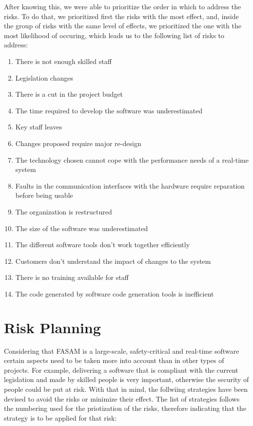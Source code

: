 After knowing this, we were able to prioritize the order in which to address the risks. To do that, we prioritized first the risks with the most effect, and, inside the group of risks with the same level of effects, we prioritized the one with the most likelihood of occuring, which leads us to the following list of risks to address:

\begin{enumerate}
    \item There is not enough skilled staff
    \item Legislation changes
    \item There is a cut in the project budget
    \item The time required to develop the software was underestimated
    \item Key staff leaves
    \item Changes proposed require major re-design
    \item The technology chosen cannot cope with the performance needs of a real-time system
    \item Faults in the communication interfaces with the hardware require reparation before being usable
    \item The organization is restructured
    \item The size of the software was underestimated
    \item The different software tools don't work together efficiently
    \item Customers don't understand the impact of changes to the system
    \item There is no training available for staff
    \item The code generated by software code generation tools is inefficient
\end{enumerate}

\section{Risk Planning}
Considering that FASAM is a large-scale, safety-critical and real-time software certain aspects need to be taken more into account than in other types of projects. For example, delivering a software that is compliant with the current legislation and made by skilled people is very important, otherwise the security of people could be put at risk. With that in mind, the follwiing strategies have been devised to avoid the risks or minimize their effect. The list of strategies follows the numbering used for the priotization of the risks, therefore indicating that the strategy is to be applied for that risk:

